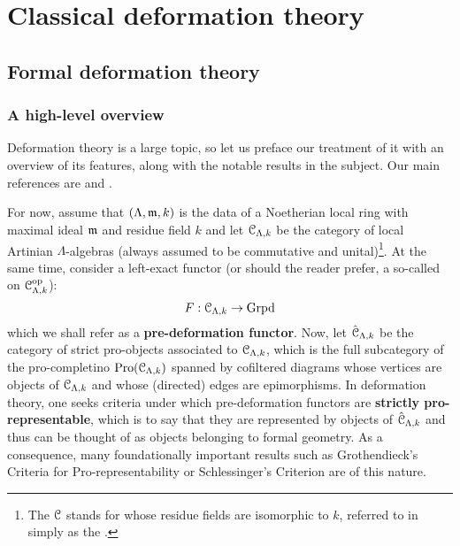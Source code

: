 \section{Classical deformation theory}
    \subsection{Formal deformation theory}
        \subsubsection{A high-level overview}
            Deformation theory is a large topic, so let us preface our treatment of it with an overview of its features, along with the notable results in the subject. Our main references are \cite[\href{https://stacks.math.columbia.edu/tag/06G7}{Tag 06G7}]{stacks} and \cite[\href{https://stacks.math.columbia.edu/tag/08KW}{Tag 08KW}]{stacks}.
            
            For now, assume that $(\Lambda, \mathfrak{m}, k)$ is the data of a Noetherian local ring with maximal ideal $\mathfrak{m}$ and residue field $k$ and let $\mathcal{C}_{\Lambda, k}$ be the category of local Artinian $\Lambda$-algebras (always assumed to be commutative and unital)\footnote{The $\mathcal{C}$ stands for  whose residue fields are isomorphic to $k$, referred to in \cite[\href{https://stacks.math.columbia.edu/tag/06G7}{Tag 06G7}]{stacks} simply as the .}. At the same time, consider a left-exact functor (or should the reader prefer, a so-called  on $\mathcal{C}_{\Lambda, k}^{\mathrm{op}}$):
                $$F: \mathcal{C}_{\Lambda, k} \to \mathrm{Grpd}$$
            which we shall refer as a \textbf{pre-deformation functor}. Now, let $\hat{\mathcal{C}}_{\Lambda, k}$ be the category of strict pro-objects associated to $\mathcal{C}_{\Lambda, k}$, which is the full subcategory of the pro-completino $\mathrm{Pro}(\mathcal{C}_{\Lambda, k})$ spanned by cofiltered diagrams whose vertices are objects of $\mathcal{C}_{\Lambda, k}$ and whose (directed) edges are epimorphisms. In deformation theory, one seeks criteria under which pre-deformation functors are \textbf{strictly pro-representable}, which is to say that they are represented by objects of $\hat{\mathcal{C}}_{\Lambda, k}$ and thus can be thought of as objects belonging to formal geometry. As a consequence, many foundationally important results such as Grothendieck's Criteria for Pro-representability or Schlessinger's Criterion are of this nature.
    

